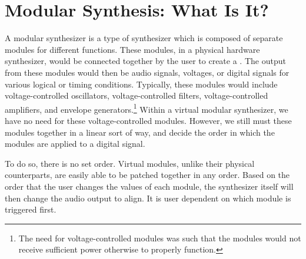 \section[Modular Synthesis: What Is It?]{Modular Synthesis: What Is It?}\label{modular-synth-what-is}

A modular synthesizer is a type of synthesizer which is composed of separate modules for different functions. These modules, in a physical hardware synthesizer, would be connected together by the user to create a . The output from these modules would then be audio signals, voltages, or digital signals for various logical or timing conditions. Typically, these modules would include voltage-controlled oscillators, voltage-controlled filters, voltage-controlled amplifiers, and envelope generators.\footnote{The need for voltage-controlled modules was such that the modules would not receive sufficient power otherwise to properly function.} Within a virtual modular synthesizer, we have no need for these voltage-controlled modules. However, we still must  these modules together in a linear sort of way, and decide the order in which the modules are applied to a digital signal. 

To do so, there is no set order. Virtual modules, unlike their physical counterparts, are easily able to be patched together in any order. Based on the order that the user changes the values of each module, the synthesizer itself will then change the audio output to align. It is user dependent on which module is triggered first.

